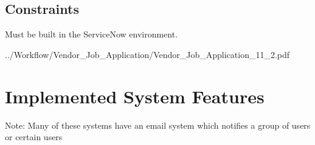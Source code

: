 \documentclass[10pt]{article}
\begin{document}
\subsection{Constraints}
Must be built in the ServiceNow environment.









\newpage







{../Workflow/Vendor_Job_Application/Vendor_Job_Application_11_2.pdf}

\newpage
\section{Implemented System Features}

Note: Many of these systems have an email system which notifies a group of users or certain users
\end{document}
